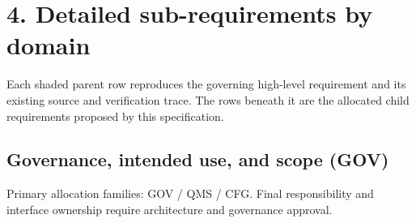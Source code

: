 \documentclass[11pt,letterpaper]{article}
\begin{document}
\section{4. Detailed sub-requirements by domain}

Each shaded parent row reproduces the governing high-level requirement and its existing source and verification trace. The rows beneath it are the allocated child requirements proposed by this specification.

\subsection{Governance, intended use, and scope (GOV)}

Primary allocation families: GOV \slash\allowbreak{} QMS \slash\allowbreak{} CFG. Final responsibility and interface ownership require architecture and governance approval.
\end{document}
